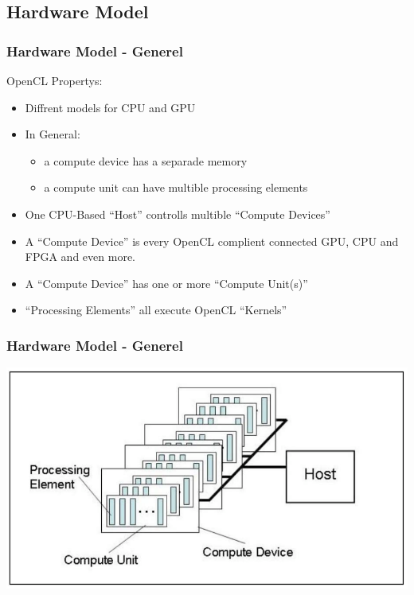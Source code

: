 \documentclass{beamer}
\begin{document}
\subsection{Hardware Model}
\begin{frame}
    \frametitle{Hardware Model - Generel}
    OpenCL Propertys:
    \begin{itemize}
     \item Diffrent models for CPU and GPU
     \item In General:
     \begin{itemize}
      \item a compute device has a separade memory
      \item a compute unit can have multible processing elements 
     \end{itemize}
     \item One CPU-Based ``Host'' controlls multible ``Compute Devices''
     \item A ``Compute Device'' is every OpenCL complient connected GPU, CPU and FPGA and even more.
     \item A ``Compute Device'' has one or more ``Compute Unit(s)''
     \item ``Processing Elements'' all execute OpenCL ``Kernels''
    \end{itemize}
\end{frame}
\begin{frame}
    \frametitle{Hardware Model - Generel}
    \includegraphics[width=\textwidth]{res/KhronosPlatformModel.png}
\end{frame}
\end{document}
